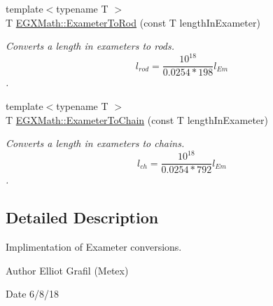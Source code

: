 \begin{DoxyCompactItemize}
{\footnotesize template$<$typename T $>$ }\\T \mbox{\hyperlink{group___e_g_x_math-_conversions-_length_conversions-_s_i-_exameter-_surveyors_ga5d842e19237d7aecc7d5c2428e4ac434}{E\+G\+X\+Math\+::\+Exameter\+To\+Rod}} (const T length\+In\+Exameter)
\begin{DoxyCompactList}\small\item\em Converts a length in exameters to rods. \[ l_{rod}= \frac{10^{18}}{0.0254 * 198} l_{Em} \]. \end{DoxyCompactList}\item 
{\footnotesize template$<$typename T $>$ }\\T \mbox{\hyperlink{group___e_g_x_math-_conversions-_length_conversions-_s_i-_exameter-_surveyors_ga2d85311f9e75da9c0f753ed578992d10}{E\+G\+X\+Math\+::\+Exameter\+To\+Chain}} (const T length\+In\+Exameter)
\begin{DoxyCompactList}\small\item\em Converts a length in exameters to chains. \[ l_{ch}= \frac{10^{18}}{0.0254 * 792} l_{Em} \]. \end{DoxyCompactList}\end{DoxyCompactItemize}


\subsection{Detailed Description}
Implimentation of Exameter conversions. 

\begin{DoxyAuthor}{Author}
Elliot Grafil (Metex) 
\end{DoxyAuthor}
\begin{DoxyDate}{Date}
6/8/18 
\end{DoxyDate}
